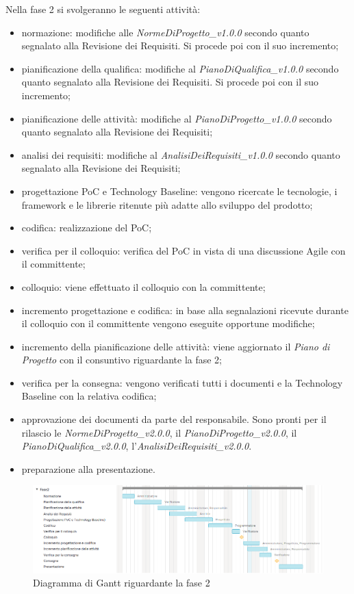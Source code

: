 Nella fase 2 si svolgeranno le seguenti attività:
\begin{itemize}
	\item normazione: modifiche alle \textit{NormeDiProgetto\_v1.0.0} secondo quanto segnalato alla Revisione dei Requisiti. Si procede poi con il suo incremento;
	\item pianificazione della qualifica: modifiche al \textit{PianoDiQualifica\_v1.0.0} secondo quanto segnalato alla Revisione dei Requisiti. Si procede poi con il suo incremento;
	\item pianificazione delle attività: modifiche al \textit{PianoDiProgetto\_v1.0.0} secondo quanto segnalato alla Revisione dei Requisiti;
	\item analisi dei requisiti: modifiche al \textit{AnalisiDeiRequisiti\_v1.0.0} secondo quanto segnalato alla Revisione dei Requisiti;
	\item progettazione PoC e Technology Baseline: vengono ricercate le tecnologie, i framework e le librerie ritenute più adatte allo sviluppo del prodotto;
	\item codifica: realizzazione del PoC;
	\item verifica per il colloquio: verifica del PoC in vista di una discussione Agile con il committente;
	\item colloquio: viene effettuato il colloquio con la committente;
	\item incremento progettazione e codifica: in base alla segnalazioni ricevute durante il colloquio con il committente vengono eseguite opportune modifiche;
	\item incremento della pianificazione delle attività: viene aggiornato il \textit{Piano di Progetto} con il consuntivo riguardante la fase 2;
	\item verifica per la consegna: vengono verificati tutti i documenti e la Technology Baseline con la relativa codifica;
	\item approvazione dei documenti da parte del responsabile. Sono pronti per il rilascio le \textit{NormeDiProgetto\_v2.0.0}, il \textit{PianoDiProgetto\_v2.0.0}, il \textit{PianoDiQualifica\_v2.0.0}, l'\textit{AnalisiDeiRequisiti\_v2.0.0}.
	\item preparazione alla presentazione.
\end{itemize}

\begin{figure}[h]
	\centering
	\includegraphics[scale=0.67]{images/fase2.png}
	\caption{Diagramma di Gantt riguardante la fase 2}
\end{figure}